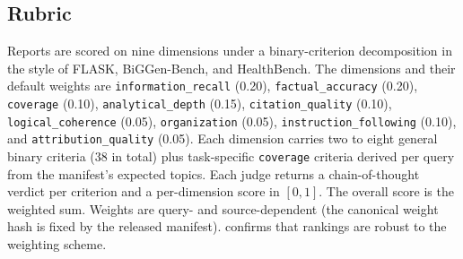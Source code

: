 \documentclass[11pt]{article}
\newcommand{\dimrow}[1]{\texttt{#1}}
\begin{document}
\subsection{Rubric}
Reports are scored on nine dimensions under a binary-criterion decomposition in the
style of FLASK, BiGGen-Bench, and HealthBench. The dimensions and their default
weights are \dimrow{information\_recall} (0.20), \dimrow{factual\_accuracy} (0.20),
\dimrow{coverage} (0.10), \dimrow{analytical\_depth} (0.15),
\dimrow{citation\_quality} (0.10), \dimrow{logical\_coherence} (0.05),
\dimrow{organization} (0.05), \dimrow{instruction\_following} (0.10), and
\dimrow{attribution\_quality} (0.05). Each dimension carries two to eight general
binary criteria ($38$ in total) plus task-specific \dimrow{coverage} criteria derived
per query from the manifest's expected topics. Each judge returns a chain-of-thought
verdict per criterion and a per-dimension score in $[0,1]$. The overall score is the
weighted sum. Weights are query- and source-dependent (the canonical weight hash is
fixed by the released manifest).  confirms that rankings
are robust to the weighting scheme.
\end{document}
